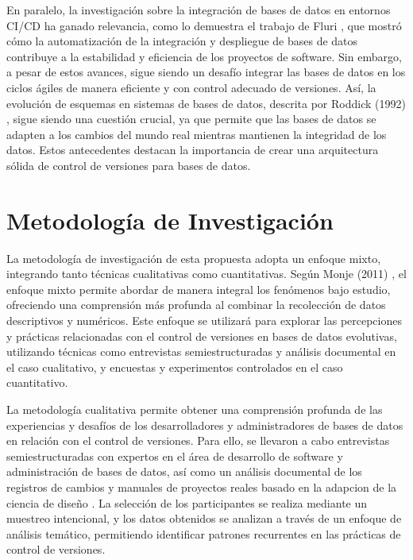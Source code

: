 \documentclass{IEEEtran}
\begin{document}
En paralelo, la investigación sobre la integración de bases de datos en entornos CI/CD ha ganado relevancia, como lo demuestra el trabajo de Fluri \cite{fluri2023measuring}, que mostró cómo la automatización de la integración y despliegue de bases de datos contribuye a la estabilidad y eficiencia de los proyectos de software. Sin embargo, a pesar de estos avances, sigue siendo un desafío integrar las bases de datos en los ciclos ágiles de manera eficiente y con control adecuado de versiones. Así, la evolución de esquemas en sistemas de bases de datos, descrita por Roddick (1992) \cite{roddick1992schema}, sigue siendo una cuestión crucial, ya que permite que las bases de datos se adapten a los cambios del mundo real mientras mantienen la integridad de los datos. Estos antecedentes destacan la importancia de crear una arquitectura sólida de control de versiones para bases de datos.

\section{Metodología de Investigación}
La metodología de investigación de esta propuesta adopta un enfoque mixto, integrando tanto técnicas cualitativas como cuantitativas. Según Monje (2011) \cite{Monje2011}, el enfoque mixto permite abordar de manera integral los fenómenos bajo estudio, ofreciendo una comprensión más profunda al combinar la recolección de datos descriptivos y numéricos. Este enfoque se utilizará para explorar las percepciones y prácticas relacionadas con el control de versiones en bases de datos evolutivas, utilizando técnicas como entrevistas semiestructuradas y análisis documental en el caso cualitativo, y encuestas y experimentos controlados en el caso cuantitativo.

La metodología cualitativa permite obtener una comprensión profunda de las experiencias y desafíos de los desarrolladores y administradores de bases de datos en relación con el control de versiones. Para ello, se llevaron a cabo entrevistas semiestructuradas con expertos en el área de desarrollo de software y administración de bases de datos, así como un análisis documental de los registros de cambios y manuales de proyectos reales basado en la adapcion de la ciencia de diseño \cite{RoblesVasquezNaranjo}. La selección de los participantes se realiza mediante un muestreo intencional, y los datos obtenidos se analizan a través de un enfoque de análisis temático, permitiendo identificar patrones recurrentes en las prácticas de control de versiones.
\end{document}
